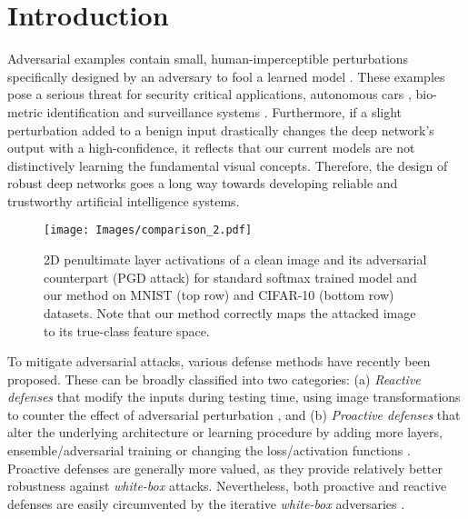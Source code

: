 \documentclass[10pt,twocolumn,letterpaper]{article}
\begin{document}
\vspace{-1em}
\section{Introduction}
\label{sec:intro}
Adversarial examples contain small, human-imperceptible perturbations specifically designed by an adversary to fool a learned model \cite{szegedy2013intriguing, 43405}. These examples pose a serious threat for security critical applications, \eg autonomous cars \cite{ackerman2017drive}, bio-metric identification \cite{sanderson2008biometric} and surveillance systems \cite{najafabadi2015deep}. Furthermore, if a slight perturbation added to a benign input drastically changes the deep network's output with a high-confidence, it reflects that our current models are not distinctively learning the fundamental visual concepts. Therefore, the design of robust deep networks goes a long way towards developing reliable and trustworthy artificial intelligence systems. 

\begin{figure}[t]
    \centering
{\texttt{[image: Images/comparison\_2.pdf]}}
    \caption{\small{2D penultimate layer activations of a clean image and its adversarial counterpart (PGD attack) for standard softmax trained model and our method on MNIST (top row) and CIFAR-10 (bottom row) datasets. Note that our method correctly maps the attacked image to its true-class feature space.}} \vspace{-1.5em}
    \label{fig:comparison}\end{figure}





To mitigate adversarial attacks, various defense methods have recently been proposed. These can be broadly classified into two categories: (a) \textit{Reactive defenses} that modify the inputs during testing time, using image transformations to counter the effect of adversarial perturbation \cite{luo2015foveation, das2017keeping, xie2017mitigating, mustafa2019image}, and (b) \emph{Proactive defenses} that alter the underlying architecture or learning procedure \eg by adding more layers, ensemble/adversarial training or changing the loss/activation functions \cite{tramer2017ensemble, kurakin2016adversarial, papernot2016distillation, cisse2017parseval, liao2017defense, pang2019improving, madry2017towards, kannan2018adversarial}. Proactive defenses are generally more valued, as they provide relatively better robustness against \textit{white-box} attacks. Nevertheless, both proactive and reactive defenses are easily circumvented by the iterative \textit{white-box} adversaries \cite{athalye2018obfuscated}.
\end{document}
